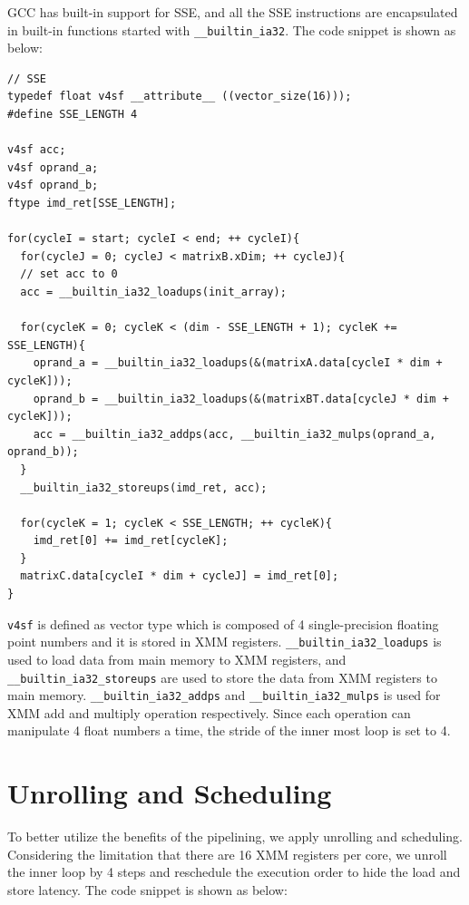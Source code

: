 \documentclass[12pt]{article}
\begin{document}
GCC has built-in support for SSE, and all the SSE instructions
are encapsulated in built-in functions started with 
\texttt{\_\_builtin\_ia32}. The code snippet is shown as below:

\footnotesize
\begin{verbatim}
// SSE
typedef float v4sf __attribute__ ((vector_size(16)));
#define SSE_LENGTH 4

v4sf acc;
v4sf oprand_a;
v4sf oprand_b;
ftype imd_ret[SSE_LENGTH];

for(cycleI = start; cycleI < end; ++ cycleI){
  for(cycleJ = 0; cycleJ < matrixB.xDim; ++ cycleJ){
  // set acc to 0
  acc = __builtin_ia32_loadups(init_array);
        
  for(cycleK = 0; cycleK < (dim - SSE_LENGTH + 1); cycleK += SSE_LENGTH){
    oprand_a = __builtin_ia32_loadups(&(matrixA.data[cycleI * dim + cycleK]));
    oprand_b = __builtin_ia32_loadups(&(matrixBT.data[cycleJ * dim + cycleK]));
    acc = __builtin_ia32_addps(acc, __builtin_ia32_mulps(oprand_a, oprand_b));
  }
  __builtin_ia32_storeups(imd_ret, acc);

  for(cycleK = 1; cycleK < SSE_LENGTH; ++ cycleK){
    imd_ret[0] += imd_ret[cycleK];
  }
  matrixC.data[cycleI * dim + cycleJ] = imd_ret[0];
}
\end{verbatim}
\normalsize

\texttt{v4sf} is defined as vector type which is composed of 4 single-precision
floating point numbers and it is stored in XMM registers. 
\texttt{\_\_builtin\_ia32\_loadups} is used to load data from main memory to 
XMM registers, and \texttt{\_\_builtin\_ia32\_storeups} are used to store the 
data from XMM registers to main memory. \texttt{\_\_builtin\_ia32\_addps} and 
\texttt{\_\_builtin\_ia32\_mulps} is used for XMM add and multiply operation 
respectively. Since each operation can manipulate 4 float numbers a time, the 
stride of the inner most loop is set to 4.

\section{Unrolling and Scheduling}
To better utilize the benefits of the pipelining, we apply unrolling and scheduling.
Considering the limitation that there are 16 XMM registers per core, we unroll the
inner loop by 4 steps and reschedule the execution order to hide the load and
store latency. The code snippet is shown as below:
\end{document}
